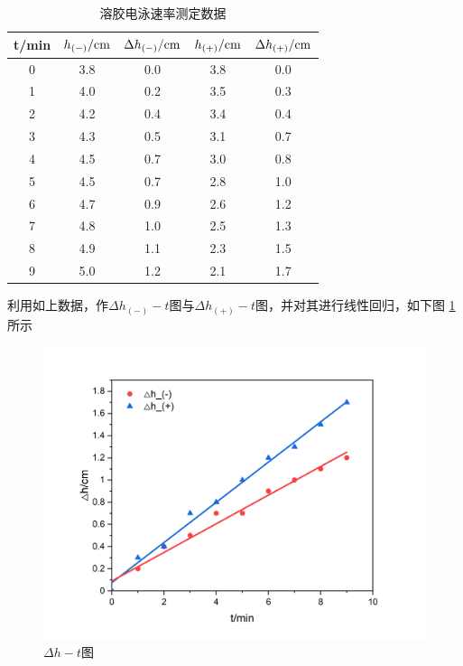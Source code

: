 \documentclass[cn,hazy,pku,12pt,normal,math=newtx,cite=super]{elegantnote}
\begin{document}
\begin{table}[h]
    \centering
    \caption{溶胶电泳速率测定数据}
    \label{6}
    \begin{tabular}{ccccc}
    \hline
    t/min & $h_{(-)} /{\rm cm}$ & $\Delta h_{(-)} /{\rm cm}$ & $h_{(+)} /{\rm cm}$ & $\Delta h_{(+)} /{\rm cm}$ \\ \hline
    0     & 3.8           & 0.0                  & 3.8           & 0.0                  \\
    1     & 4.0           & 0.2                  & 3.5           & 0.3                  \\
    2     & 4.2           & 0.4                  & 3.4           & 0.4                  \\
    3     & 4.3           & 0.5                  & 3.1           & 0.7                  \\
    4     & 4.5           & 0.7                  & 3.0           & 0.8                  \\
    5     & 4.5           & 0.7                  & 2.8           & 1.0                  \\
    6     & 4.7           & 0.9                  & 2.6           & 1.2                  \\
    7     & 4.8           & 1.0                  & 2.5           & 1.3                  \\
    8     & 4.9           & 1.1                  & 2.3           & 1.5                  \\
    9     & 5.0           & 1.2                  & 2.1           & 1.7                  \\ \hline
    \end{tabular}
\end{table}

利用如上数据，作$\Delta h_{(-)} - t$图与$\Delta h_{(+)} - t$图，并对其进行线性回归，如下图 \ref{7} 所示
\begin{figure}[htbp]
    \centering
    \includegraphics[width = .63\textwidth]{image/Graph3.png}
    \caption{$\Delta h - t$图}\label{7}
\end{figure}
\end{document}
